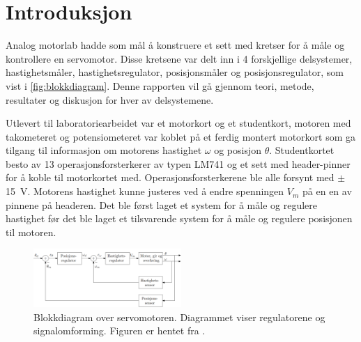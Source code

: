 \section{Introduksjon}\label{sec:intro}

Analog motorlab hadde som mål å konstruere et sett med kretser for å måle og kontrollere en servomotor. Disse kretsene var delt inn i 4 forskjellige delsystemer, hastighetsmåler, hastighetsregulator, posisjonsmåler og posisjonsregulator, som vist i \autoref{fig:blokkdiagram}. Denne rapporten vil gå gjennom teori, metode, resultater og diskusjon for hver av delsystemene.

Utlevert til laboratoriearbeidet var et motorkort og et studentkort, motoren med takometeret og potensiometeret var koblet på et ferdig montert motorkort som ga tilgang til informasjon om motorens hastighet $\omega$ og posisjon $\theta$. Studentkortet besto av 13 operasjonsforsterkerer av typen LM741\cite{LM741} og et sett med header-pinner for å koble til motorkortet med. Operasjonsforsterkerene ble alle forsynt med $\pm${\SI{15}{\volt}}. Motorens hastighet kunne justeres ved å endre spenningen $V_m$ på en en av pinnene på headeren. Det ble først laget et system for å måle og regulere hastighet før det ble laget et tilsvarende system for å måle og regulere posisjonen til motoren.

\begin{figure}[bh]
    \centering
    \includegraphics[width = 0.5\textwidth]{figurer/Blokkdiagram.png}
    \caption{Blokkdiagram over servomotoren. Diagrammet viser regulatorene og signalomforming. Figuren er hentet fra \cite{AnalogMotorlabbOppgaver}.}
    \label{fig:blokkdiagram}
\end{figure}



